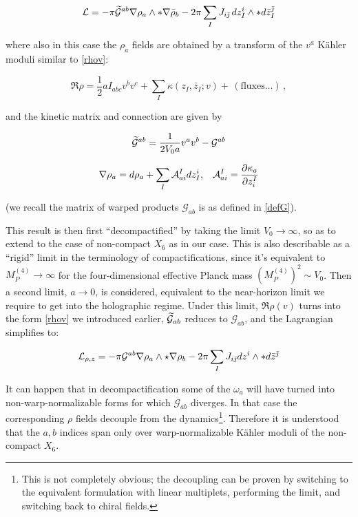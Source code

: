 \begin{equation}
	\mathcal{L} = - \pi \widetilde{\mathcal{G}}^{ab} \nabla \rho_a \wedge \ast \nabla \bar\rho_b - 2\pi \sum_I J_{i\bar{\jmath}}\, dz_I^i \wedge \ast d\bar z_I^{\bar\jmath}
	\label{}
\end{equation}

where also in this case the $\rho_a$ fields are obtained by a transform of the $v^a$ K\"ahler moduli similar to \eqref{rhov}:

\begin{equation}
	\Re \rho  = \frac{1}{2} a I_{abc} v^b v^c + \sum_I \kappa(z_I,\bar z_I; v) + \, (\text{fluxes}\ldots) \,,
	\label{}
\end{equation}

and the kinetic matrix and connection are given by

\begin{equation}
	\widetilde{\mathcal{G}}^{ab} = \frac{1}{2V_0 a} v^a v^b - \mathcal{G}^{ab}
	\label{}
\end{equation}

\begin{align}
	\nabla \rho_a = d\rho_a + \sum_I \mathcal{A}^I_{ai} dz_I^i, && \mathcal{A}^I_{ai} = \frac{\partial\kappa_a}{\partial z^I_i}
	\label{}
\end{align}

(we recall the matrix of warped products $\mathcal{G}_{ab}$ is as defined in \eqref{defG}).

This result is then first ``decompactified'' by taking the limit $V_0 \rightarrow \infty$, so as to extend to the case of non-compact $X_6$ as in our case. This is also describable as a ``rigid'' limit in the terminology of compactifications, since it's equivalent to $M_P^{(4)} \rightarrow \infty$ for the four-dimensional effective Planck mass $(M_P^{(4)})^2 \sim V_0$. Then a second limit, $a \rightarrow 0$, is considered, equivalent to the near-horizon limit we require to get into the holographic regime. Under this limit, $\Re \rho(v)$ turns into the form \eqref{rhov} we introduced earlier, $\widetilde{\mathcal{G}}_{ab}$ reduces to $\mathcal{G}_{ab}$, and the Lagrangian simplifies to:

\begin{equation}
	\mathcal{L}_{\rho,z} = - \pi \mathcal{G}^{ab} \nabla \rho_a \wedge \star \nabla \rho_b - 2\pi \sum_I J_{i\bar{\jmath}} dz^i \wedge \ast d\bar z^{\bar\jmath}
	\label{}
\end{equation}

It can happen that in decompactification some of the $\omega_a$ will have turned into non-warp-normalizable forms for which $\mathcal{G}_{ab}$ diverges. In that case the corresponding $\rho$ fields decouple from the dynamics\footnote{This is not completely obvious; the decoupling can be proven \cite{MZ} by switching to the equivalent formulation with linear multiplets, performing the limit, and switching back to chiral fields.}. Therefore it is understood that the $a,b$ indices span only over warp-normalizable K\"ahler moduli of the non-compact $X_6$.

